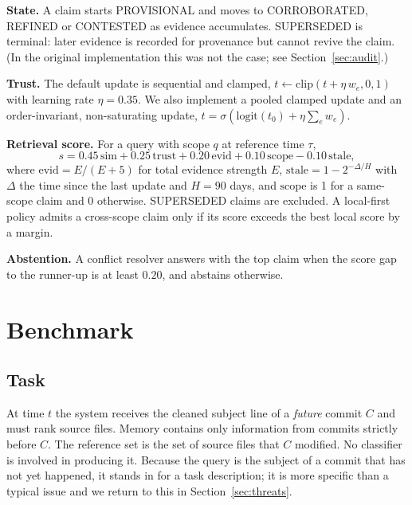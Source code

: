 \documentclass[11pt,a4paper]{article}
\begin{document}
\textbf{State.} A claim starts PROVISIONAL and moves to CORROBORATED, REFINED or CONTESTED as evidence accumulates. SUPERSEDED is terminal: later evidence is recorded for provenance but cannot revive the claim. (In the original implementation this was not the case; see Section~\ref{sec:audit}.)

\textbf{Trust.} The default update is sequential and clamped, $t \leftarrow \mathrm{clip}(t + \eta\, w_e,0,1)$ with learning rate $\eta=0.35$. We also implement a pooled clamped update and an order-invariant, non-saturating update, $t=\sigma(\mathrm{logit}(t_0)+\eta\sum_e w_e)$.

\textbf{Retrieval score.} For a query with scope $q$ at reference time $\tau$,
\begin{equation}
s = 0.45\,\mathrm{sim} + 0.25\,\mathrm{trust} + 0.20\,\mathrm{evid} + 0.10\,\mathrm{scope} - 0.10\,\mathrm{stale},
\end{equation}
where $\mathrm{evid}=E/(E+5)$ for total evidence strength $E$, $\mathrm{stale}=1-2^{-\Delta/H}$ with $\Delta$ the time since the last update and $H=90$ days, and $\mathrm{scope}$ is 1 for a same-scope claim and 0 otherwise. SUPERSEDED claims are excluded. A local-first policy admits a cross-scope claim only if its score exceeds the best local score by a margin.

\textbf{Abstention.} A conflict resolver answers with the top claim when the score gap to the runner-up is at least $0.20$, and abstains otherwise.

\section{Benchmark}
\label{sec:bench}
\subsection{Task}
At time $t$ the system receives the cleaned subject line of a \emph{future} commit $C$ and must rank source files. Memory contains only information from commits strictly before $C$. The reference set is the set of source files that $C$ modified. No classifier is involved in producing it. Because the query is the subject of a commit that has not yet happened, it stands in for a task description; it is more specific than a typical issue and we return to this in Section~\ref{sec:threats}.
\end{document}
